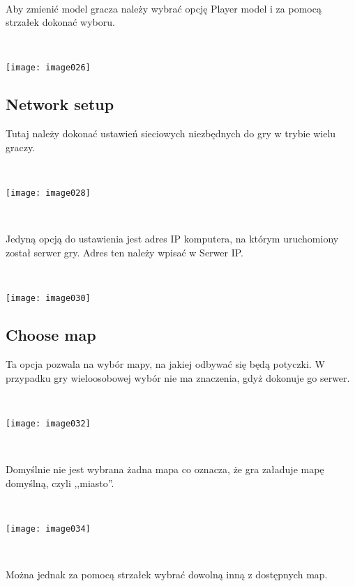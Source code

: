 \documentclass[licencjacka]{pracamgr}
\begin{document}
\ \

Aby zmienić model gracza należy wybrać opcję Player model i za pomocą strzałek dokonać wyboru.

\begin{center}
\ \

\texttt{[image: image026]}
\end{center}

\subsection{Network setup}

Tutaj należy dokonać ustawień sieciowych niezbędnych do gry w trybie wielu graczy.

\begin{center}
\ \

\texttt{[image: image028]}
\end{center}

\ \

Jedyną opcją do ustawienia jest adres IP komputera, na którym uruchomiony został serwer gry. Adres ten należy wpisać w Serwer IP.

\begin{center}
\ \

\texttt{[image: image030]}
\end{center}

\subsection{Choose map}

Ta opcja pozwala na wybór mapy, na jakiej odbywać się będą potyczki. W przypadku gry wieloosobowej wybór nie ma znaczenia, gdyż dokonuje go serwer.

\begin{center}
\ \

\texttt{[image: image032]}
\end{center}

\ \

Domyślnie nie jest wybrana żadna mapa co oznacza, że gra załaduje mapę domyślną, czyli ,,miasto''.

\begin{center}
\ \

\texttt{[image: image034]}
\end{center}

\ \

Można jednak za pomocą strzałek wybrać dowolną inną z dostępnych map.
\end{document}
